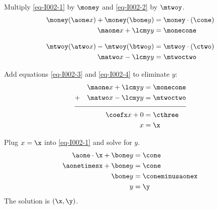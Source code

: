 \begin{solution}
Multiply \eqref{eq-I002-1} by $\money$ and \eqref{eq-I002-2} by $\mtwoy$.
\begin{align}
\money(\aone x) + \money(\bone y) &=\money\cdot(\cone) \nonumber \\
\maone x + \lcmy y &= \monecone \label{eq-I002-3}
\end{align}

\begin{align}
\mtwoy(\atwo x) - \mtwoy(\btwo y) &=\mtwoy\cdot(\ctwo) \nonumber \\
\matwo x - \lcmy y &= \mtwoctwo \label{eq-I002-4}
\end{align}

Add equations \eqref{eq-I002-3} and \eqref{eq-I002-4} to eliminate $y$: 
\begin{align}
&& \maone x + \lcmy y &= \monecone \nonumber \\
+&& \matwo x - \lcmy y &= \mtwoctwo  \nonumber\\[-0.5em]
\cline{1-4}
&& \coefx x+0 &=\cthree \nonumber\\
&& x&=\x\nonumber
\end{align}



Plug $x=\x$ into \eqref{eq-I002-1} and solve for $y$.
\begin{align*}
\aone\cdot \x+ \bone y &=\cone \\
\aonetimesx+\bone y&= \cone\\
\bone y&= \coneminusaonex \\
y&=\y
\end{align*}
The solution is $(\x,\y)$. 

\end{solution}
